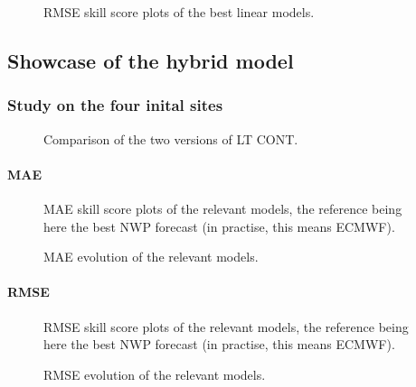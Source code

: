 \begin{figure}[htb!]
    \centering
    
\caption{RMSE skill score plots of the best linear models.}
\end{figure}
\subsection{Showcase of the hybrid model}
\subsubsection{Study on the four inital sites}
\begin{figure}[htb!]
    \centering
    
\caption{Comparison of the two versions of LT CONT.}
\end{figure}
\paragraph{MAE}
\begin{figure}[htb!]
    \centering
    
\caption{MAE skill score plots of the relevant models, the reference being here the best NWP forecast (in practise, this means ECMWF).}
\end{figure}

\begin{figure}[htb!]
    \centering
    
\caption{MAE evolution of the relevant models.}
\end{figure}


\paragraph{RMSE}
\begin{figure}[htb!]
    \centering
    
\caption{RMSE skill score plots of the relevant models, the reference being here the best NWP forecast (in practise, this means ECMWF).}
\end{figure}

\begin{figure}[htb!]
    \centering
    
\caption{RMSE evolution of the relevant models.}
\end{figure}

